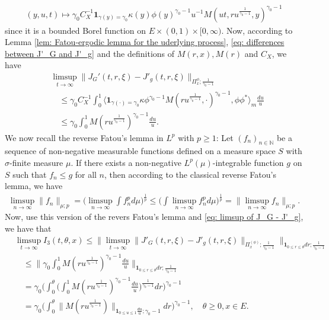 \documentclass[UTF8]{pkuthss}
\theoremstyle{plain}
\theoremstyle{definition}
\numberwithin{equation}{section}
\begin{document}
\begin{align}
	(y,u,t)
	\mapsto \gamma_0 C_X^{-1}\mathbf 1_{\gamma(y) = \gamma_0} \kappa(y)  \phi(y)^{\gamma_0 - 1}  u^{-1} M(ut,ru^{\frac{1}{\gamma_0 - 1}},y)^{\gamma_0 - 1}
\end{align}
	since it is a bounded Borel function on $E\times (0,1) \times [0,\infty)$.
	Now, according to Lemma \ref{lem: Fatou-ergodic lemma for the uderlying process},  \eqref{eq: differences between J'_G and J'_g} and
    the definitions of
$M(r,x), M(r)$ and $C_X$, we have
\begin{align}\label{eq: limsup of J_G - J'_g}
	&\limsup_{t\to \infty} \| J_G'(t,r,\xi) - J'_g(t,r,\xi) \|_{\Pi_x^{\phi};\frac{1}{\gamma_0 - 1}}
	\\&\quad\leq  \gamma_0 C_X^{-1} \int_0^1 \big\langle \mathbf 1_{\gamma(\cdot) = \gamma_0} \kappa \phi^{\gamma_0 - 1} M(ru^{\frac{1}{\gamma_0 - 1}},\cdot)^{\gamma_0 - 1}, \phi\phi^* \big\rangle_m \frac{du}{u}
	\\&\quad\leq  \gamma_0  \int_0^1  M(ru^{\frac{1}{\gamma_0 - 1}})^{\gamma_0 - 1} \frac{du}{u}.
\end{align}
	We now recall the reverse Fatou's lemma in $L^p$ with $p\geq 1$: Let $(f_n)_{n\in \mathbb N}$ be a sequence of non-negative measurable functions defined on a measure space $S$ with $\sigma$-finite measure $\mu$. If there exists a non-negative $L^p(\mu)$-integrable function $g$ on $S$ such that $f_n \leq g$ for all $n$, then according to the classical reverse Fatou's lemma, we have
\begin{align}
	\limsup_{n\to \infty}\big\| f_n \big\|_{\mu;p}
	= \Big (   \limsup_{n\to \infty}  \int f^p_n d\mu        \Big)^{\frac{1}{p}}
	\leq  \Big (   \int \limsup_{n\to \infty} f^p_n d\mu        \Big)^{\frac{1}{p}}
	= \big\| \limsup_{n\to \infty} f_n \big\|_{\mu;p}.
\end{align}
	Now, use this version of the revers Fatou's lemma and \eqref{eq: limsup of J_G - J'_g}, we have that
\begin{align}
	&\limsup_{t\to \infty} I_3(t,\theta, x)
	\leq \big\| \limsup_{t\to \infty} \|    J'_G(t,r,\xi) - J'_g(t,r,\xi) \|_{\Pi_x^{(\phi)};\frac{1}{\gamma_0 - 1}} \big\|_{\mathbf 1_{0\leq r\leq \theta} dr;\frac{1}{\gamma_0 - 1}}
	\\&\quad\leq \Big\| \gamma_0  \int_0^1  M(ru^{\frac{1}{\gamma_0 - 1}})^{\gamma_0 - 1} \frac{du}{u} \Big\|_{\mathbf 1_{0\leq r\leq \theta} dr;\frac{1}{\gamma_0 - 1}}
	\\&\quad = \gamma_0 \bigg( \int_0^\theta \Big (   \int_0^1  M(ru^{\frac{1}{\gamma_0 - 1}})^{\gamma_0 - 1} \frac{du}{u}   \Big )^{\frac{1}{\gamma_0 - 1}} dr \bigg)^{\gamma_0 - 1}
	\\&\quad = \gamma_0 \Big(  \int_0^\theta  \| M(r u^{\frac{1}{\gamma_0 - 1}}) \|_{\mathbf 1_{0\leq u\leq 1}\frac{du}{u};\gamma_0 - 1}  dr\Big)^{\gamma_0 - 1},
	\quad \theta \geq 0, x\in E.
\end{align}
	
\end{document}

